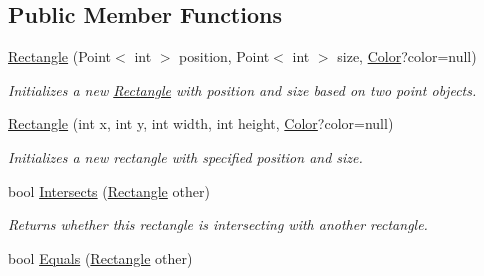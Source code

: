 \subsection*{Public Member Functions}
\begin{DoxyCompactItemize}
\item 
\hyperlink{struct_tri_devs_1_1_tri_engine_1_1_rectangle_ab1c4ed209c8c80200f13759e6749405c}{Rectangle} (Point$<$ int $>$ position, Point$<$ int $>$ size, \hyperlink{struct_tri_devs_1_1_tri_engine_1_1_color}{Color}?color=null)
\begin{DoxyCompactList}\small\item\em Initializes a new \hyperlink{struct_tri_devs_1_1_tri_engine_1_1_rectangle}{Rectangle} with position and size based on two point objects. \end{DoxyCompactList}\item 
\hyperlink{struct_tri_devs_1_1_tri_engine_1_1_rectangle_ad5c2f3ee0e275c7e84faee50dc645119}{Rectangle} (int x, int y, int width, int height, \hyperlink{struct_tri_devs_1_1_tri_engine_1_1_color}{Color}?color=null)
\begin{DoxyCompactList}\small\item\em Initializes a new rectangle with specified position and size. \end{DoxyCompactList}\item 
bool \hyperlink{struct_tri_devs_1_1_tri_engine_1_1_rectangle_af80938259f3834c2ffd5535ca4e1d455}{Intersects} (\hyperlink{struct_tri_devs_1_1_tri_engine_1_1_rectangle}{Rectangle} other)
\begin{DoxyCompactList}\small\item\em Returns whether this rectangle is intersecting with another rectangle. \end{DoxyCompactList}\item 
bool \hyperlink{struct_tri_devs_1_1_tri_engine_1_1_rectangle_a4c8f0bfa57e796a4f55cd3a216d153ee}{Equals} (\hyperlink{struct_tri_devs_1_1_tri_engine_1_1_rectangle}{Rectangle} other)
\end{DoxyCompactItemize}
